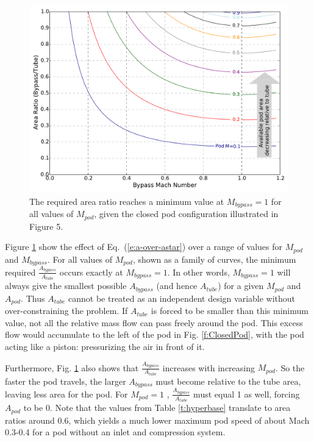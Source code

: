 \documentclass[heading.tex]{subfiles}
\begin{document}
\begin{figure}[!htb]
  \centering
  \includegraphics[width=.9\textwidth]{images/areaPlot.pdf}
  \caption{The required area ratio reaches a minimum value at $M_{bypass}=1$ for all values of $M_{pod}$, given the closed pod configuration illustrated in Figure 5.}
  \label{f:choked-flow}
\end{figure}

Figure \ref{f:choked-flow} show the effect of Eq.~(\ref{e:a-over-astar}) over a range of values for $M_{pod}$ and $M_{bypass}$. 
For all values of $M_{pod}$, shown as a family of curves, the minimum required $\frac{A_{bypass}}{A_{tube}}$ occurs exactly at $M_{bypass}=1$.
In other words, 
$M_{bypass}=1$ will always give the smallest possible $A_{bypass}$ (and hence $A_{tube}$) for a given 
$M_{pod}$ and $A_{pod}$. Thus $A_{tube}$ cannot be treated as an independent design variable without over-constraining the problem.
If $A_{tube}$ is forced to be smaller than this minimum value, not all the relative mass flow can pass freely around the pod. This excess 
flow would accumulate to the left of the pod in Fig. \ref{f:ClosedPod},
with the pod acting like a piston: pressurizing the air in front of it. 

Furthermore, Fig. \ref{f:choked-flow} also shows that $\frac{A_{bypass}}{A_{tube}}$ 
increases with increasing $M_{pod}$. So the faster the pod travels, the larger $A_{bypass}$ 
must become relative to the tube area, leaving less area for the pod. For $M_{pod} = 1$ , $\frac{A_{bypass}}{A_{tube}}$ must 
equal 1 as well, forcing $A_{pod}$ to be 0. Note that the values from Table \ref{t:hyperbase} translate to area ratios around 0.6, 
which yields a much lower maximum pod speed of about Mach 0.3-0.4 for a pod without an inlet and compression system. 
\end{document}
